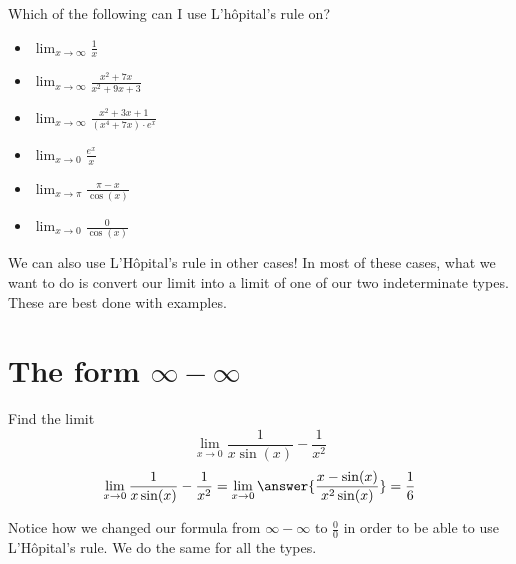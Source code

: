 \documentclass{ximera}
\begin{document}
\begin{example}\label{example:10-11}
Which of the following can I use L'hôpital's rule on?
\begin{itemize}
  \item $\displaystyle\lim _{x \rightarrow \infty} \frac{1}{x}$ \quad {}
  \item $\displaystyle\lim _{x \rightarrow \infty} \frac{x^{2}+7 x}{x^{2}+9 x+3}$ \quad {}
  \item $\displaystyle\lim _{x \rightarrow \infty} \frac{x^{2}+3 x+1}{\left(x^{4}+7 x\right) \cdot e^{x}}$ \quad {}
  \item $\displaystyle\lim _{x \rightarrow 0} \frac{e^{x}}{x}$ \quad {}
  \item $\displaystyle\lim _{x \rightarrow \pi} \frac{\pi-x}{\cos (x)}$ \quad {}
  \item $\displaystyle\lim _{x \rightarrow 0} \frac{0}{\cos (x)}$ \quad {}
\end{itemize}
\end{example}

We can also use L'Hôpital's rule in other cases! In most of these cases, what we want to do is convert our limit into a limit of one of our two indeterminate types. These are best done with examples.

\section{The form $\infty-\infty$}

\begin{example}\label{example:10-12}
Find the limit
\[
\lim _{x \rightarrow 0} \frac{1}{x \sin (x)}-\frac{1}{x^{2}}
\]
\[
\lim _{x \rightarrow 0} \frac{1}{x \sin (x)}-\frac{1}{x^{2}}=\lim _{x \rightarrow 0}\answer{\frac{x-\sin(x)}{x^{2}\sin(x)}}=\frac{1}{6}
\]
\end{example}

Notice how we changed our formula from $\infty-\infty$ to $\frac{0}{0}$ in order to be able to use L'Hôpital's rule. We do the same for all the types.
\end{document}
